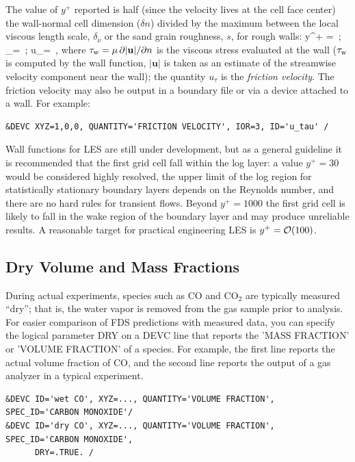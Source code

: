 \documentclass[11pt]{book}
\begin{document}
\noindent
The value of $y^+$ reported is half (since the velocity lives at the cell face center) the wall-normal cell dimension ($\delta n$) divided by the maximum between the local viscous length scale, $\delta_\nu$ \cite{Pope:2000} or the sand grain roughness, $s$, for rough walls:
\be
y^+ =  \,\mbox{;} \quad\quad \delta_\nu =  \,\mbox{;} \quad\quad u_\tau =  \,\mbox{,}
\ee
where $\tau_{\rm w} = \mu\,\partial |\mathbf{u}|/\partial n$ is the viscous stress evaluated at the wall ($\tau_{\rm w}$ is computed by the wall function, $|\mathbf{u}|$ is taken as an estimate of the streamwise velocity component near the wall); the quantity $u_\tau$ is the \emph{friction velocity}.  The friction velocity may also be output in a boundary file or via a device attached to a wall.  For example:
\begin{lstlisting}
&DEVC XYZ=1,0,0, QUANTITY='FRICTION VELOCITY', IOR=3, ID='u_tau' /
\end{lstlisting}

\noindent Wall functions for LES are still under development, but as a general guideline it is recommended that the first grid cell fall within the log layer: a value $y^+=30$ would be considered highly resolved, the upper limit of the log region for statistically stationary boundary layers depends on the Reynolds number, and there are no hard rules for transient flows.  Beyond $y^+=1000$ the first grid cell is likely to fall in the wake region of the boundary layer and may produce unreliable results.  A reasonable target for practical engineering LES is $y^+ = {\cal O}(100)$.


\subsection{Dry Volume and Mass Fractions}
\label{info:dry}

During actual experiments, species such as CO and CO$_2$ are typically measured ``dry''; that is, the water vapor is removed from the gas sample prior to analysis.  For easier comparison of FDS predictions with measured data,
you can specify the logical parameter {\ct DRY} on a {\ct DEVC} line that reports the {\ct 'MASS FRACTION'} or {\ct 'VOLUME FRACTION'} of a species.  For example, the first line reports the actual volume fraction of CO, and the second line reports the output of a gas analyzer in a typical experiment.

\begin{lstlisting}
&DEVC ID='wet CO', XYZ=..., QUANTITY='VOLUME FRACTION', SPEC_ID='CARBON MONOXIDE'/
&DEVC ID='dry CO', XYZ=..., QUANTITY='VOLUME FRACTION', SPEC_ID='CARBON MONOXIDE',
      DRY=.TRUE. /
\end{lstlisting}
\end{document}
